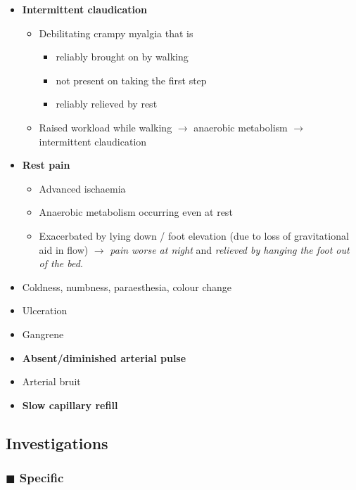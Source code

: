 \documentclass[
  12pt,
]{memoir}
\providecommand{\tightlist}{%
  \setlength{\itemsep}{0pt}\setlength{\parskip}{0pt}}
\begin{document}
\begin{itemize}
\tightlist
\item
  \textbf{Intermittent claudication}

  \begin{itemize}
  \tightlist
  \item
    Debilitating crampy myalgia that is

    \begin{itemize}
    \tightlist
    \item
      reliably brought on by walking
    \item
      not present on taking the first step
    \item
      reliably relieved by rest
    \end{itemize}
  \item
    Raised workload while walking \(\rightarrow\) anaerobic metabolism
    \(\rightarrow\) intermittent claudication
  \end{itemize}
\item
  \textbf{Rest pain}

  \begin{itemize}
  \tightlist
  \item
    Advanced ischaemia
  \item
    Anaerobic metabolism occurring even at rest
  \item
    Exacerbated by lying down / foot elevation (due to loss of
    gravitational aid in flow) \(\rightarrow\) \emph{pain worse at
    night} and \emph{relieved by hanging the foot out of the bed}.
  \end{itemize}
\item
  Coldness, numbness, paraesthesia, colour change
\item
  Ulceration
\item
  Gangrene
\item
  \textbf{Absent/diminished arterial pulse}
\item
  Arterial bruit
\item
  \textbf{Slow capillary refill}
\end{itemize}

\hypertarget{investigations-2}{%
\subsection{Investigations}\label{investigations-2}}

\hypertarget{blacksquare-specific}{%
\subsubsection{\texorpdfstring{\(\blacksquare\)
Specific}{\textbackslash blacksquare Specific}}\label{blacksquare-specific}}
\end{document}
